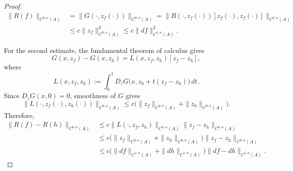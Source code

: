 \documentclass[10pt,a4paper]{amsart}
\begin{document}
\begin{proof}
\begin{align}\label{eq: Holder-estimate-Rf}
    \|R(f)\|_{C^{0,\alpha}(A)}
    &=
    \|G(\cdot,z_f(\cdot))\|_{C^{0,\alpha}(A)} =
    \|B(\cdot,z_f(\cdot))[z_f(\cdot),z_f(\cdot)]\|_{C^{0,\alpha}(A)} \\
    \nonumber
    &\le
    c\|z_f\|_{C^{0,\alpha}(A)}^2 \le
    c\|df\|_{C^{1,\alpha}(A)}^2.
\end{align}


For the second estimate, the fundamental theorem of calculus gives
\[
    G(x,z_f)-G(x,z_h)
    =
    L(x,z_f,z_h)[z_f-z_h],
\]
where
\[
    L(x,z_f,z_h)
    :=
    \int_0^1
    D_zG\bigl(x,z_h+t(z_f-z_h)\bigr)\,dt .
\]
Since \(D_zG(x,0)=0\), smoothness of \(G\) gives
\[
    \|L(\cdot,z_f(\cdot),z_h(\cdot))\|_{C^{0,\alpha}(A)}
    \le
    c\bigl(
        \|z_f\|_{C^{0,\alpha}(A)}
        +
        \|z_h\|_{C^{0,\alpha}(A)}
    \bigr).
\]
Therefore,
\[
\begin{aligned}
    \|R(f)-R(h)\|_{C^{0,\alpha}(A)}
    &\le
    c\|L(\cdot,z_f,z_h)\|_{C^{0,\alpha}(A)}
    \|z_f-z_h\|_{C^{0,\alpha}(A)} \\
    &\le
    c\bigl(
        \|z_f\|_{C^{0,\alpha}(A)}
        +
        \|z_h\|_{C^{0,\alpha}(A)}
    \bigr)
    \|z_f-z_h\|_{C^{0,\alpha}(A)} \\
    &\le
    c\bigl(
        \|df\|_{C^{1,\alpha}(A)}
        +
        \|dh\|_{C^{1,\alpha}(A)}
    \bigr)
    \|df-dh\|_{C^{1,\alpha}(A)}.
\end{aligned}
\]
\end{proof}
\end{document}
